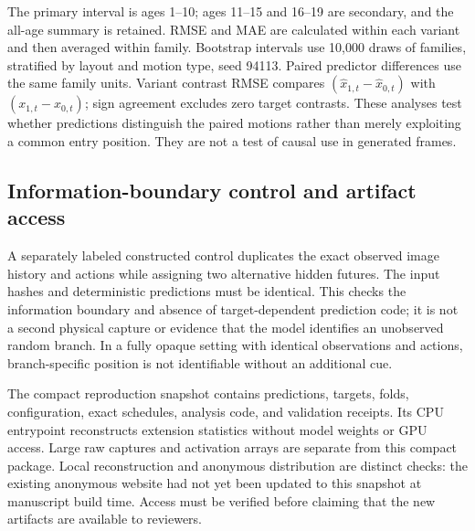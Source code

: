 The primary interval is ages 1--10; ages 11--15 and 16--19 are secondary, and the
all-age summary is retained. RMSE and MAE are calculated within each variant and
then averaged within family. Bootstrap intervals use 10,000 draws of families,
stratified by layout and motion type, seed 94113. Paired predictor differences use
the same family units. Variant contrast RMSE compares
$(\hat x_{1,t}-\hat x_{0,t})$ with $(x_{1,t}-x_{0,t})$; sign agreement excludes
zero target contrasts. These analyses test whether predictions distinguish the
paired motions rather than merely exploiting a common entry position. They are
not a test of causal use in generated frames.

\subsection{Information-boundary control and artifact access}
A separately labeled constructed control duplicates the exact observed image
history and actions while assigning two alternative hidden futures. The input
hashes and deterministic predictions must be identical. This checks the
information boundary and absence of target-dependent prediction code; it is not
a second physical capture or evidence that the model identifies an unobserved
random branch. In a fully opaque setting with identical observations and actions,
branch-specific position is not identifiable without an additional cue.

The compact reproduction snapshot contains predictions, targets, folds,
configuration, exact schedules, analysis code, and validation receipts. Its CPU
entrypoint reconstructs extension statistics without model weights or GPU access.
Large raw captures and activation arrays are separate from this compact package.
Local reconstruction and anonymous distribution are distinct checks: the existing
anonymous website had not yet been updated to this snapshot at manuscript build
time. Access must be verified before claiming that the new artifacts are available
to reviewers.
